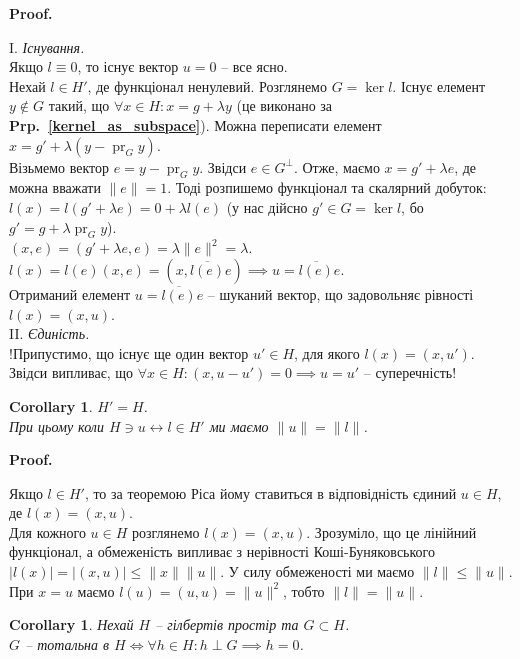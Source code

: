 \documentclass[a4paper, 10pt]{article}
\makeatletter
\theoremstyle{theoremdd}
\theoremstyle{theoremdd}
\theoremstyle{theoremdd}
\theoremstyle{theoremdd}
\theoremstyle{theoremdd}
\theoremstyle{theoremdd}
\theoremstyle{theoremdd}
\theoremstyle{theoremdd}
\newtheorem{corollary}[theorem]{Corollary}
\newcommand\prpref[1]{\textbf{Prp.~\ref{#1}}}
\DeclareMathOperator{\pr}{pr}
\renewenvironment{proof}[1][Proof.\\]{\par
\pushQED{\hfill \qed}%
\normalfont \topsep6\p@\@plus6\p@\relax
\trivlist
\item\relax
{\bfseries
#1\@addpunct{.}}\hspace\labelsep\ignorespaces
}{%
\popQED\endtrivlist\@endpefalse
}
\makeatother
\begin{document}
\begin{proof}
I. \textit{Існування.}\\
Якщо $l \equiv 0$, то існує вектор $u = 0$ -- все ясно.\\
Нехай $l \in H'$, де функціонал ненулевий. Розглянемо $G = \ker l$. Існує елемент $y \notin G$ такий, що $\forall x \in H: x = g + \lambda y$ (це виконано за \prpref{kernel_as_subspace}). Можна переписати елемент $x = g' + \lambda(y- \pr_G y)$.\\
Візьмемо вектор $e = y - \pr_Gy$. Звідси $e \in G^\perp$. Отже, маємо $x = g' + \lambda e$, де можна вважати $\|e\| = 1$. Тоді розпишемо функціонал та скалярний добуток:\\
$l(x) = l(g'+\lambda e) = 0 + \lambda l(e)$ (у нас дійсно $g' \in G = \ker l$, бо $g' = g + \lambda \pr_G y$).\\
$(x,e) = (g'+\lambda e,e) = \lambda \|e\|^2 = \lambda$.\\
$l(x) = l(e)(x,e) = (x,\overline{l(e)}e) \implies u = \overline{l(e)}e$.\\
Отриманий елемент $u = \overline{l(e)}e$ -- шуканий вектор, що задовольняє рівності $l(x) = (x,u)$.
\bigskip \\
II. \textit{Єдиність.}\\
!Припустимо, що існує ще один вектор $u' \in H$, для якого $l(x) = (x,u')$. Звідси випливає, що $\forall x \in H: (x,u-u') = 0 \implies u = u'$ -- суперечність!
\end{proof}

\begin{corollary}
$H' = H$.\\
При цьому коли $H \ni u \leftrightarrow l \in H'$ ми маємо $\|u\| = \|l\|$.
\end{corollary}

\begin{proof}
Якщо $l \in H'$, то за теоремою Ріса йому ставиться в відповідність єдиний $u \in H$, де $l(x) = (x,u)$.\\
Для кожного $u \in H$ розглянемо $l(x) = (x,u)$. Зрозуміло, що це лінійний функціонал, а обмеженість випливає з нерівності Коші-Буняковського $|l(x)| = |(x,u)| \leq \|x\| \|u\|$. У силу обмеженості ми маємо $\|l\| \leq \|u\|$. При $x = u$ маємо $l(u) = (u,u) = \|u\|^2$, тобто $\|l\| = \|u\|$.
\end{proof}

\begin{corollary}
Нехай $H$ -- гілбертів простір та $G \subset H$.\\
$G$ -- тотальна в $H \iff \forall h \in H: h \perp G \implies h = 0$.
\end{corollary}
\end{document}
